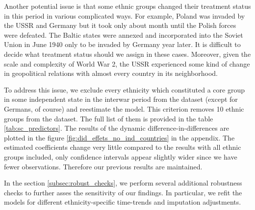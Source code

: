 Another potential issue is that some ethnic groups changed their treatment status in this period in various complicated ways. For example, Poland was invaded by the USSR and Germany but it took  only about month until the Polish forces were defeated. The Baltic states were annexed and incorporated into the Soviet Union in June 1940 only to be invaded by Germany year later. 
It is difficult to decide what treatment status should we assign in these cases. 
Moreover, given the scale and complexity of World War 2, the USSR experienced  some kind of change in geopolitical relations with almost every country in its neighborhood.  

To address this issue, we exclude every ethnicity which constituted a core group in some independent state in the interwar period from the dataset (except for Germans, of course) and reestimate the model. This criterion removes 10 ethnic groups from the dataset. The full list of them is provided in the table \ref{tab:sc_predictors}. The results of the dynamic difference-in-differences are plotted in the figure \ref{fig:did_effets_no_ind_countries} in the appendix. The estimated coefficients change  very little compared to the results with all ethnic groups included, only confidence intervals appear slightly wider since we have fewer observations. Therefore our previous results are maintained. 

In the section \ref{subsec:robust_checks}, we perform several additional robustness checks to further asses the sensitivity of our findings. In particular, we refit the models for different ethnicity-specific time-trends and imputation adjustments. 

 


